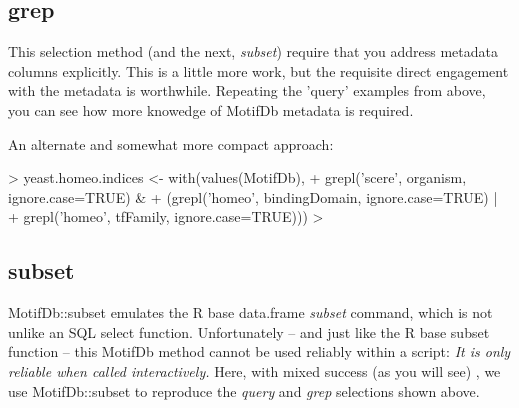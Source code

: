 \documentclass{article}
\renewenvironment{Schunk}{\vspace{\topsep}}{\vspace{\topsep}}
\begin{document}
\subsection{grep}
This selection method (and the next, \emph{subset}) require that you address metadata columns explicitly.  This is a little more
work, but the requisite direct engagement with the metadata is worthwhile.  Repeating the 'query' examples from above,
you can see how more knowedge of MotifDb metadata is required.
\begin{Schunk}
\end{Schunk}

An alternate and somewhat more compact approach:
\begin{Schunk}
\begin{Sinput}
> yeast.homeo.indices <- with(values(MotifDb),
+   grepl('scere', organism, ignore.case=TRUE) &
+     (grepl('homeo', bindingDomain, ignore.case=TRUE) |
+      grepl('homeo', tfFamily, ignore.case=TRUE)))
> 
\end{Sinput}
\end{Schunk}
\subsection{subset}
MotifDb::subset emulates the R base data.frame \emph{subset} command, which is not unlike an SQL select function.
Unfortunately -- and just like the R base subset function -- this MotifDb method cannot be used reliably  within a script:
\emph{It is only reliable when called interactively.}  Here, with mixed success (as you will see) , we use MotifDb::subset to
reproduce the \emph{query} and \emph{grep} selections shown above.
\end{document}
